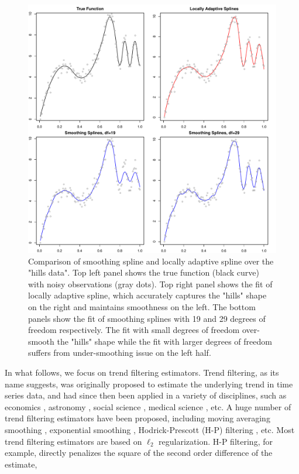 \documentclass[a4paper]{article}
\begin{document}
\begin{figure}[t!]
\centering
\includegraphics[width = 1\textwidth]{Figures/ssvslars.pdf}
\caption{Comparison of smoothing spline and locally adaptive spline over the "hills data". Top left panel shows the true function (black curve) with noisy observations (gray dots). Top right panel shows the fit of locally adaptive spline, which accurately captures the "hills" shape on the right and maintains smoothness on the left. The bottom panels show the fit of smoothing splines with 19 and 29 degrees of freedom respectively. The fit with small degrees of freedom over-smooth the "hills" shape while the fit with larger degrees of freedom suffers from under-smoothing issue on the left half.}
\label{fig:ssvslars}
\end{figure}

In what follows, we focus on trend filtering estimators. Trend filtering, as its name suggests, was originally proposed to estimate the underlying trend in time series data, and had since then been applied in a variety of disciplines, such as economics \cite{hodrick1997postwar,tsay2005analysis}, astronomy \cite{kovacs2008application}, social science \cite{saha2012learning,levitt2004understanding}, medical science \cite{greenland1992methods,link1994estimating}, etc. A huge number of trend filtering estimators have been proposed, including moving averaging smoothing \cite{leser1961simple,kendall1946advanced}, exponential smoothing \cite{lucas1980two}, Hodrick-Prescott (H-P) filtering \cite{hodrick1997postwar}, etc. Most trend filtering estimators are based on $\ell_2$ regularization. H-P filtering, for example, directly penalizes the square of the second order difference of the estimate,
\end{document}
